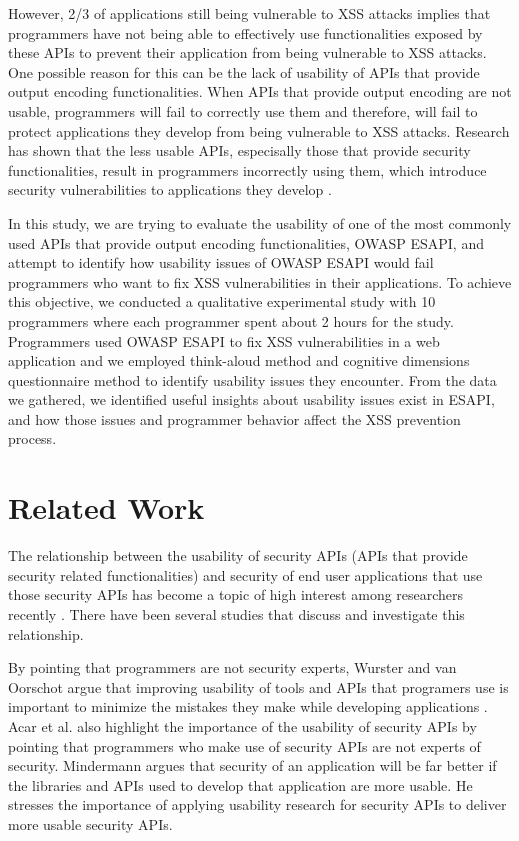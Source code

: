 \documentclass[10pt]{article}
\begin{document}
However, 2/3 of applications still being vulnerable to XSS attacks implies that programmers have not being able to effectively use functionalities exposed by these APIs to prevent their application from being vulnerable to XSS attacks. One possible reason for this can be the lack of usability of APIs that provide output encoding functionalities. When APIs that provide output encoding are not usable, programmers will fail to correctly use them and therefore, will fail to protect applications they develop from being vulnerable to XSS attacks. Research has shown that the less usable APIs, especisally those that provide security functionalities, result in programmers incorrectly using them, which introduce security vulnerabilities to applications they develop \cite{georgiev}.

In this study, we are trying to evaluate the usability of one of the most commonly used APIs that provide output encoding functionalities, OWASP ESAPI, and attempt to identify how usability issues of OWASP ESAPI would fail programmers who want to fix XSS vulnerabilities in their applications. To achieve this objective, we conducted a qualitative experimental study with 10 programmers where each programmer spent about 2 hours for the study. Programmers used OWASP ESAPI to fix XSS vulnerabilities in a web application and we employed think-aloud method \cite{thinkaloud} and cognitive dimensions questionnaire method \cite{wijaya} to identify usability issues they encounter. From the data we gathered, we identified useful insights about usability issues exist in ESAPI, and how those issues and programmer behavior affect the XSS prevention process.

\section{Related Work}

The relationship between the usability of security APIs (APIs that provide security related functionalities) and security of end user applications that use those security APIs has become a topic of high interest among researchers recently \cite{wijaya,acar, acargit,gorski,green2016developers,mindermann}  . There have been several studies that discuss and investigate this relationship. 

By pointing that programmers are not security experts, Wurster and van Oorschot argue that improving usability of tools and APIs that programers use is important to minimize the mistakes they make while developing applications \cite{wurster}. Acar et al. \cite{acarold} also highlight the importance of the usability of security APIs by pointing that programmers who make use of security APIs are not experts of security. Mindermann \cite{mindermann} argues that security of an application will be far
better if the libraries and APIs used to develop that application are
more usable. He stresses the importance of applying usability
research for security APIs to deliver more usable security
APIs. 
\end{document}
